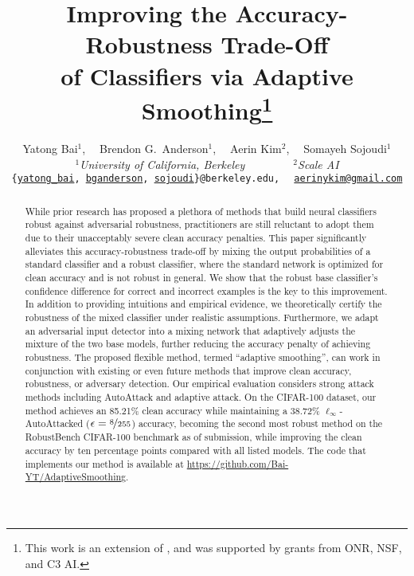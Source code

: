 \documentclass[11pt, letterpaper]{article}
\theoremstyle{plain}
\theoremstyle{definition}
\begin{document}
\title{Improving the Accuracy-Robustness Trade-Off\\of Classifiers via Adaptive Smoothing\thanks{This work is an extension of \citep{Bai23a}, and was supported by grants from ONR, NSF, and C3 AI.}}

\author{
Yatong Bai$^1$,$\quad\;$Brendon G.\ Anderson$^1$,$\quad\;$Aerin Kim$^2$,$\quad\;$Somayeh Sojoudi$^1$\\
\textit{$^1$University of California, Berkeley $\qquad\qquad^2$Scale AI}\\
{\tt\small \{\href{mailto:<yatong_bai@berkeley.edu>?Subject=Your 2023 paper}{yatong\_bai}{}, \href{mailto:<bganderson@berkeley.edu>?Subject=Your 2023 paper}{bganderson}{}, \href{mailto:<sojoudi@berkeley.edu>?Subject=Your 2023 paper}{sojoudi}{}\}@berkeley.edu, $\;$ \tt\small \href{mailto:aerinykim@gmail.com>?Subject=Your 2023 paper}{aerinykim@gmail.com}{}}
}

\maketitle


\begin{abstract}
While prior research has proposed a plethora of methods that build neural classifiers robust against adversarial robustness, practitioners are still reluctant to adopt them due to their unacceptably severe clean accuracy penalties.
This paper significantly alleviates this accuracy-robustness trade-off by mixing the output probabilities of a standard classifier and a robust classifier, where the standard network is optimized for clean accuracy and is not robust in general.
We show that the robust base classifier's confidence difference for correct and incorrect examples is the key to this improvement.
In addition to providing intuitions and empirical evidence, we theoretically certify the robustness of the mixed classifier under realistic assumptions. 
Furthermore, we adapt an adversarial input detector into a mixing network that adaptively adjusts the mixture of the two base models, further reducing the accuracy penalty of achieving robustness.
The proposed flexible method, termed ``adaptive smoothing'', can work in conjunction with existing or even future methods that improve clean accuracy, robustness, or adversary detection.
Our empirical evaluation considers strong attack methods including AutoAttack and adaptive attack. On the CIFAR-100 dataset, our method achieves an 85.21\% clean accuracy while maintaining a 38.72\% $\ell_\infty$-AutoAttacked ($\epsilon = \nicefrac{8}{255}$) accuracy, becoming the second most robust method on the RobustBench CIFAR-100 benchmark as of submission, while improving the clean accuracy by ten percentage points compared with all listed models.
The code that implements our method is available at \url{https://github.com/Bai-YT/AdaptiveSmoothing}.
\end{abstract}
\end{document}

